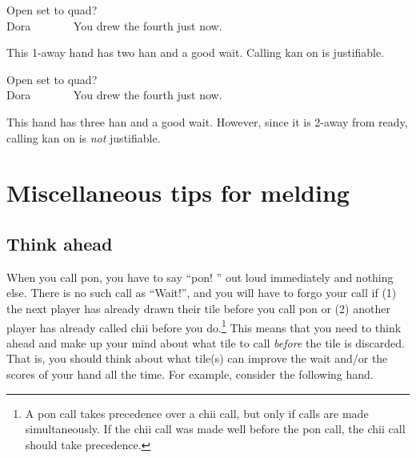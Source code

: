 \begin{itembox}[r]{Open set to quad?}
\bp
{}~\zhong\rzhong\zhong~\\
\hfill\footnotesize{{\jap Dora}~~~~~~~}
\ep
\vspace{-15pt}You drew the fourth {\LARGE\zhong} just now.
\end{itembox}

\bigskip
This 1-away hand has two {\jap han} and a good wait. Calling {\jap kan} on {\LARGE\zhong} is justifiable. 

\newpage
\begin{itembox}[r]{Open set to quad?}
\bp
{}~\zhong\rzhong\zhong~\\
\hfill\footnotesize{{\jap Dora}~~~~~~~}
\ep
\vspace{-15pt}You drew the fourth {\LARGE\zhong} just now.
\end{itembox}

\bigskip
This hand has three {\jap han} and a good wait. However, since it is 2-away from ready, calling {\jap kan} on {\LARGE\zhong} is \emph{not} justifiable. 

\newpage
\section{Miscellaneous tips for melding}

\subsection{Think ahead}

When you call {\jap pon}, you have to say ``{\jap pon}! \textipa{[p\'\textopeno\ng]}'' out loud immediately and nothing else. There is no such call as ``Wait!'',  and you will have to forgo your call if (1) the next player has already drawn their tile before you call {\jap pon} or (2) another player has already called {\jap chii} before you do.\footnote{A {\jap pon} call takes precedence over a {\jap chii} call, but only if calls are made simultaneously. If the {\jap chii} call was made well before the {\jap pon} call, the {\jap chii} call should take precedence.}
This means that you need to think ahead and make up your mind about what tile to call \emph{before} the tile is discarded. That is, you should think about what tile(s) can improve the wait and/or the scores of your hand all the time. For example, consider the following hand. 

